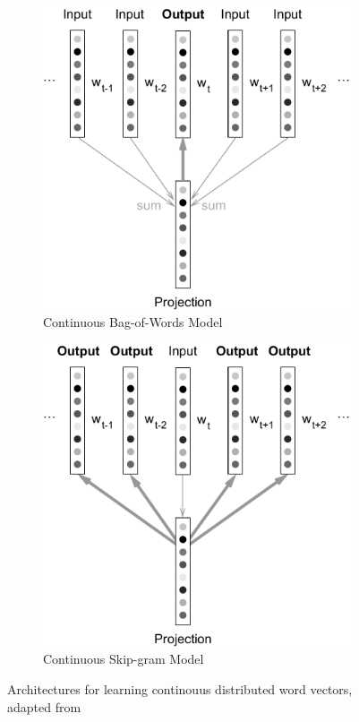 \begin{figure}[h]
    \centering
    \begin{subfigure}[b]{0.49\textwidth}
        \includegraphics[width=\textwidth]{img/cbow_vert2.pdf}
        \caption{Continuous Bag-of-Words Model}
\label{fig:cbow}
    \end{subfigure}
    \begin{subfigure}[b]{0.49\textwidth}
        \includegraphics[width=\textwidth]{img/skip-gram_vert2.pdf}
        \caption{Continuous Skip-gram Model}
\label{fig:skip-gram}
    \end{subfigure}
    \caption{Architectures for learning continouus distributed word vectors, adapted from~\cite{Mikolov:2013ad}}
\label{fig:cbow-skip-gram}
\end{figure}

